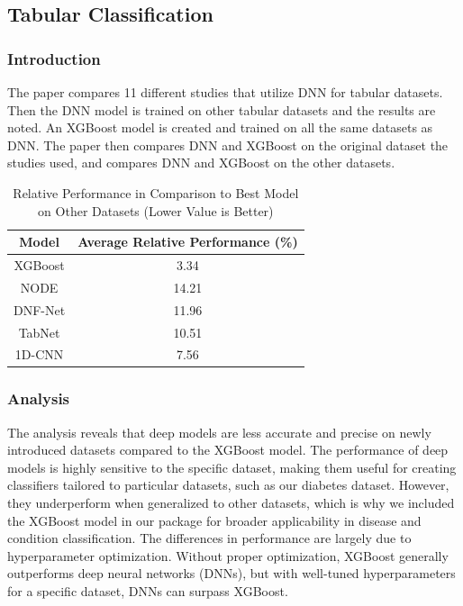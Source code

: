 \documentclass[conference]{IEEEtran}
\begin{document}
\subsection{Tabular Classification }
\subsubsection{Introduction}

The paper\cite{b7} compares 11 different studies that utilize DNN for tabular datasets. Then the DNN model is trained on other tabular datasets and the results are noted. An XGBoost model is created and trained on all the same datasets as DNN. The paper then compares DNN and XGBoost on the original dataset the studies used, and compares DNN and XGBoost on the other datasets.


\begin{table}[ht]
\caption{Relative Performance in Comparison to Best Model on Other Datasets (Lower Value is Better)}
\begin{center}
\begin{tabular}{|c|c|}
\hline
\textbf{Model} & \textbf{Average Relative Performance (\%)} \\
\hline
XGBoost & 3.34 \\
NODE & 14.21 \\
DNF-Net & 11.96 \\
TabNet & 10.51 \\
1D-CNN & 7.56 \\
\hline
\end{tabular}
\end{center}
\end{table}

\subsubsection{Analysis}
The analysis reveals that deep models are less accurate and precise on newly introduced datasets compared to the XGBoost model. The performance of deep models is highly sensitive to the specific dataset, making them useful for creating classifiers tailored to particular datasets, such as our diabetes dataset. However, they underperform when generalized to other datasets, which is why we included the XGBoost model in our package for broader applicability in disease and condition classification. The differences in performance are largely due to hyperparameter optimization. Without proper optimization, XGBoost generally outperforms deep neural networks (DNNs), but with well-tuned hyperparameters for a specific dataset, DNNs can surpass XGBoost.
\end{document}

